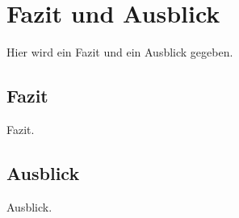 \chapter{Fazit und Ausblick}
Hier wird ein Fazit und ein Ausblick gegeben.

\section{Fazit}
Fazit.

\section{Ausblick}
Ausblick.